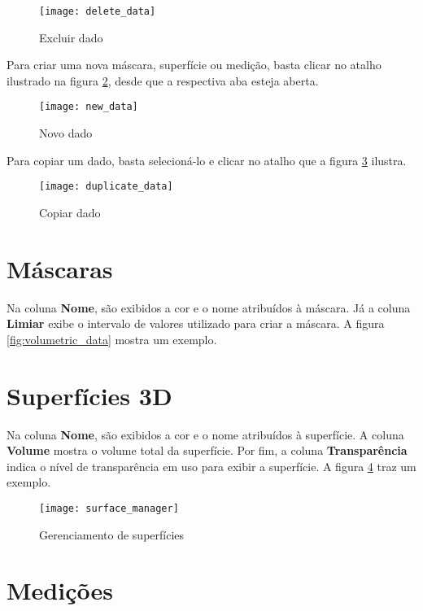 \begin{figure}[!htb]
\centering
\texttt{[image: delete\_data]}
\caption{Excluir dado}
\label{fig:delete_data}
\end{figure}

Para criar uma nova máscara, superfície ou medição, basta clicar no atalho ilustrado na figura
\ref{fig:new_data}, desde que a respectiva aba esteja aberta.

\begin{figure}[!htb]
\centering
\texttt{[image: new\_data]}
\caption{Novo dado}
\label{fig:new_data}
\end{figure}

Para copiar um dado, basta selecioná-lo e clicar no atalho que a figura \ref{fig:duplicate_data}
ilustra.

\begin{figure}[!htb]
\centering
\texttt{[image: duplicate\_data]}
\caption{Copiar dado}
\label{fig:duplicate_data}
\end{figure}


\newpage


\section{Máscaras}

Na coluna \textbf{Nome}, são exibidos a cor e o nome atribuídos à máscara. Já a coluna
\textbf{Limiar} exibe o intervalo de valores utilizado para criar a máscara. A figura
\ref{fig:volumetric_data} mostra um exemplo.

\section{Superfícies 3D}

Na coluna \textbf{Nome}, são exibidos a cor e o nome atribuídos à superfície. A coluna 
\textbf{Volume} mostra o volume total da superfície. Por fim, a coluna \textbf{Transparência}
indica o nível de transparência em uso para exibir a superfície. A figura \ref{fig:surface_manager}
traz um exemplo.

\begin{figure}[!htb]
\centering
\texttt{[image: surface\_manager]}
\caption{Gerenciamento de superfícies}
\label{fig:surface_manager}
\end{figure}


\newpage


\section{Medições}

